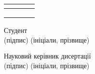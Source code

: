 \documentclass[]{lib/styles/additional-docs}
\begin{document}
{\begin{tabular}{|l|l|l|l|l|l|}
      & \multicolumn{2}{l|}{}                                                                                           & \multicolumn{2}{l|}{}                                                                                           &                               \\ \hline
      & \multicolumn{2}{l|}{}                                                                                           & \multicolumn{2}{l|}{}                                                                                           &                               \\ \hline
      & \multicolumn{2}{l|}{}                                                                                           & \multicolumn{2}{l|}{}                                                                                           &                               \\ \hline
      & \multicolumn{2}{l|}{}                                                                                           & \multicolumn{2}{l|}{}                                                                                           &                               \\ \hline
  \end{tabular}}

  \vspace{2em}

  { Студент \hspace{10em} \uline{\hspace*{6em}} \hspace{5em}  }\\
  { \hspace*{15.5em} \small (підпис)\hspace*{9em} \small (ініціали, прізвище) }

  \vspace{1em}

  Науковий керівник дисертації  \hspace{0.8em} \uline{\hspace*{6em}} \hspace{5em} \\
  { \hspace*{15.5em} \small (підпис)\hspace*{9em} \small (ініціали, прізвище) }

  \restoregeometry
\end{document}
